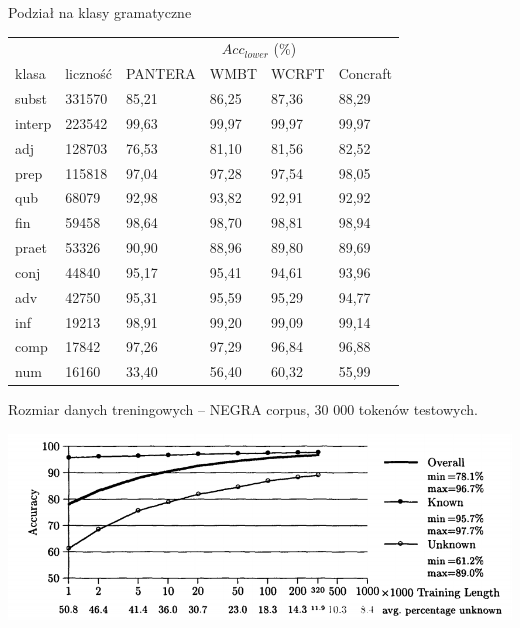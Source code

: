 \documentclass{beamer}
\begin{document}
\begin{frame}{Podział na klasy gramatyczne}
\begin{center}
\begin{tabular}{llllll}
 &  & \multicolumn{4}{c}{$Acc_{lower}$ (\%)} \\
klasa & liczność & PANTERA & WMBT & WCRFT & Concraft \\
\hline
subst & 331570 & 85,21 & 86,25 & 87,36 & 88,29 \\
interp & 223542 & 99,63 & 99,97 & 99,97 & 99,97 \\
adj & 128703 & 76,53 & 81,10 & 81,56 & 82,52 \\
prep & 115818 & 97,04 & 97,28 & 97,54 & 98,05 \\
qub & 68079 & 92,98 & 93,82 & 92,91 & 92,92 \\
fin & 59458 & 98,64 & 98,70 & 98,81 & 98,94 \\
praet & 53326 & 90,90 & 88,96 & 89,80 & 89,69 \\
conj & 44840 & 95,17 & 95,41 & 94,61 & 93,96 \\
adv & 42750 & 95,31 & 95,59 & 95,29 & 94,77 \\
inf & 19213 & 98,91 & 99,20 & 99,09 & 99,14 \\
comp & 17842 & 97,26 & 97,29 & 96,84 & 96,88 \\
num & 16160 & 33,40 & 56,40 & 60,32 & 55,99 \\
\end{tabular}
\end{center}
\end{frame}

\begin{frame}{Rozmiar danych treningowych}
   -- NEGRA corpus, 30 000 tokenów testowych.
  \begin{center}
    \includegraphics[width=\textwidth]{img/tnt_lcurve.png}
  \end{center}
\end{frame}
\end{document}
